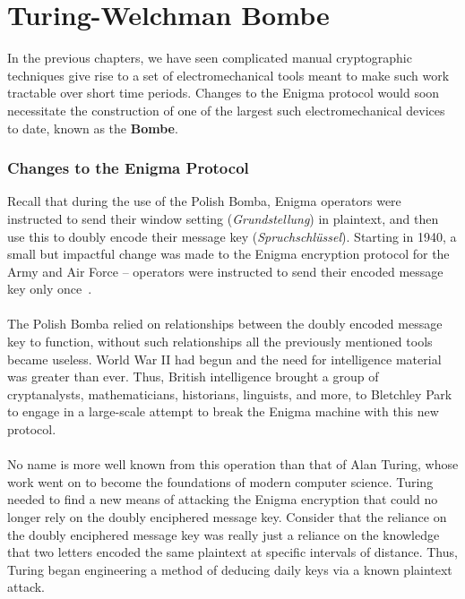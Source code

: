 

\chapter{Turing-Welchman Bombe}

In the previous chapters, we have seen complicated manual
cryptographic techniques give rise to a set of electromechanical
tools meant to make such work tractable over short time periods.
Changes to the Enigma protocol would soon necessitate the
construction of one of the largest such electromechanical devices to
date, known as the {\bf{Bombe}}.

\subsection{Changes to the Enigma Protocol}
Recall that during the use of the Polish Bomba, Enigma operators were
instructed to send their window setting (\emph{Grundstellung}) in
plaintext, and then use this to doubly encode their message key
(\emph{Spruchschlüssel}). Starting in 1940, a small but impactful
change was made to the Enigma encryption protocol for the Army and
Air Force -- operators were instructed to send their encoded message
key only once~\cite[pp.~331--332]{rijmenants2010enigma}.
\\\\The Polish Bomba relied on relationships between the doubly
encoded message key to function, without such relationships all the
previously mentioned tools became useless. World War II had begun and
the need for intelligence material was greater than ever. Thus,
British intelligence brought a group of cryptanalysts,
mathematicians, historians, linguists, and more, to Bletchley Park to
engage in a large-scale attempt to break the Enigma machine with this
new protocol.
\\\\No name is more well known from this operation than that of Alan
Turing, whose work went on to become the foundations of modern
computer science. Turing needed to find a new means of attacking the
Enigma encryption that could no longer rely on the doubly enciphered
message key. Consider that the reliance on the doubly enciphered
message key was really just a reliance on the knowledge that two
letters encoded the same plaintext at specific intervals of distance.
Thus, Turing began engineering a method of deducing daily keys via a
known plaintext attack.

